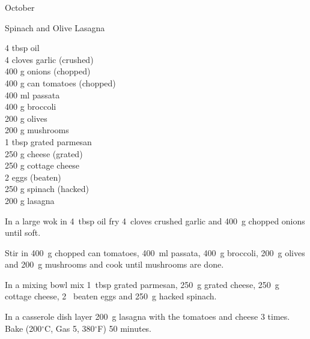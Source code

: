 \begin{menu}{October}
    \begin{recipe}{2}{Spinach and Olive Lasagna}%
		\begin{ingredients}
		4 tbsp oil  \\
	4 cloves garlic (crushed) \\
	400 g onions (chopped) \\
	400 g can tomatoes (chopped) \\
	400 ml passata  \\
	400 g broccoli  \\
	200 g olives  \\
	200 g mushrooms  \\
	1 tbsp grated parmesan  \\
	250 g cheese (grated) \\
	250 g cottage cheese  \\
	2  eggs (beaten) \\
	250 g spinach (hacked) \\
	200 g lasagna  \\
	
		\end{ingredients}
	
	
    \begin{instructions}
    \item 
        In a large wok in
        4~tbsp  oil
        fry
        4~cloves crushed garlic
        and
        400~g chopped onions
        until soft.
      \item 
        Stir in
        400~g chopped can tomatoes,
        400~ml  passata,
        400~g  broccoli,
        200~g  olives
        and
        200~g  mushrooms
        and cook until mushrooms are done.
      \item 
        In a mixing bowl mix
        1~tbsp  grated parmesan,
        250~g grated cheese,
        250~g  cottage cheese,
        2~ beaten eggs
        and
        250~g hacked spinach.
      \item 
        In a casserole dish layer
        200~g  lasagna
        with the tomatoes and cheese 3 times.
        Bake (200$^{\circ}$C, Gas 5, 380$^{\circ}$F) 50 minutes.
      
    \end{instructions}
    \end{recipe}%
  

\end{menu}
